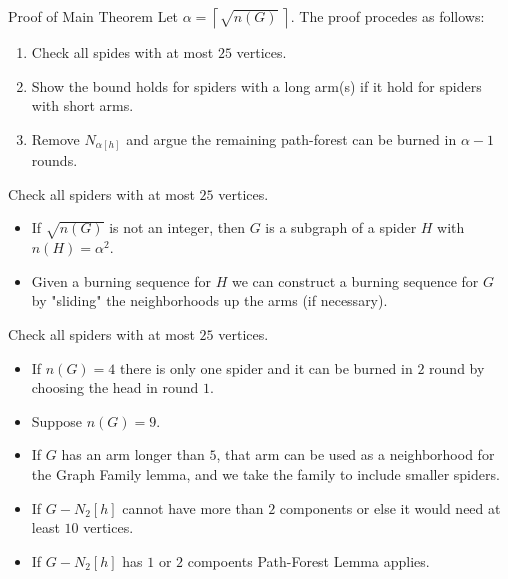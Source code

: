 \documentclass{beamer}
\begin{document}
\begin{frame}{Proof of Main Theorem}
    Let $\alpha = \left\lceil \sqrt{n(G)}\ \right\rceil$.
    The proof procedes as follows:
    \begin{enumerate}
        \item Check all spides with at most $25$ vertices.
        \item Show the bound holds for spiders with a long arm(s) if it hold for spiders with short arms.
        \item Remove $N_{\alpha[h]}$ and argue the remaining path-forest can be burned in $\alpha - 1$ rounds.
    \end{enumerate}
\end{frame}

\begin{frame}{Check all spiders with at most $25$ vertices.}
\begin{itemize}
\item If $\sqrt{n(G)}$ is not an integer, then $G$ is a subgraph of a spider $H$ with $n(H) = \alpha^2$.\\
\item Given a burning sequence for $H$ we can construct a burning sequence for $G$ by "sliding" the neighborhoods up the arms (if necessary).
\end{itemize}
\end{frame}

\begin{frame}{Check all spiders with at most $25$ vertices.}
\begin{itemize}
\item If $n(G)=4$ there is only one spider and it can be burned in $2$ round by choosing the head in round $1$.
\item Suppose $n(G) = 9$.
\item If $G$ has an arm longer than $5$, that arm can be used as a neighborhood for the Graph Family lemma, and we take the family to include smaller spiders.
\item If $G - N_2[h]$ cannot have more than $2$ components or else it would need at least $10$ vertices.
\item If $G - N_2[h]$ has $1$ or $2$ compoents Path-Forest Lemma applies.
\end{itemize}
\end{frame}
\end{document}
